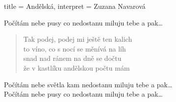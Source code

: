 \begin{song}{title = {Andělská}, interpret = {Zuzana Navarová}}
\begin{chorus}
Počítám nebe pusy co nedostanu miluju tebe a pak\dots
\end{chorus}

\begin{verse}
Tak podej, podej mi ještě ten kalich \\
to víno, co s nocí se měnívá na líh \\
snad nad ránem na dně se dočtu \\
že v kastlíku andělskou počtu mám
\end{verse}

\begin{chorus}
Počítám nebe světla kam nedostanu miluju tebe a pak\dots  \\
Počítám nebe pusy co nedostanu miluju tebe a pak\dots
\end{chorus}

\end{song}
